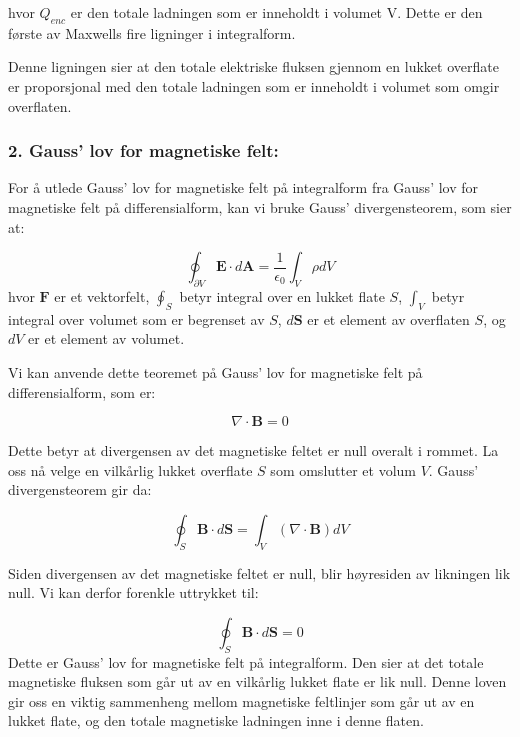 hvor $Q_{enc}$ er den totale ladningen som er inneholdt i volumet V. Dette er den første av Maxwells fire ligninger i integralform.

Denne ligningen sier at den totale elektriske fluksen gjennom en lukket overflate er proporsjonal med den totale ladningen som er inneholdt i volumet som omgir overflaten.


\subsubsection*{2. Gauss' lov for magnetiske felt:}
For å utlede Gauss' lov for magnetiske felt på integralform fra Gauss' lov for magnetiske felt på differensialform, kan vi bruke Gauss' divergensteorem, som sier at:

\begin{equation*}
    \oint_{\partial V} \mathbf{E} \cdot d \mathbf{A}=\frac{1}{\epsilon_{0}} \int_{V} \rho d V 
\end{equation*}
hvor $\mathbf{F}$ er et vektorfelt, $\oint_S$ betyr integral over en lukket flate $S$, $\int_V$ betyr integral over volumet som er begrenset av $S$, $d\mathbf{S}$ er et element av overflaten $S$, og $dV$ er et element av volumet.

Vi kan anvende dette teoremet på Gauss' lov for magnetiske felt på differensialform, som er:

\begin{equation*}
    \nabla \cdot \mathbf{B}=0 
\end{equation*}

Dette betyr at divergensen av det magnetiske feltet er null overalt i rommet. La oss nå velge en vilkårlig lukket overflate $S$ som omslutter et volum $V$. Gauss' divergensteorem gir da:

\begin{equation*}
    \oint_{S} \mathbf{B} \cdot d \mathbf{S}=\int_{V}(\nabla \cdot \mathbf{B}) d V
\end{equation*}

Siden divergensen av det magnetiske feltet er null, blir høyresiden av likningen lik null. Vi kan derfor forenkle uttrykket til:

\begin{equation*}
    \oint_{S} \mathbf{B} \cdot d \mathbf{S}=0 
\end{equation*}
Dette er Gauss' lov for magnetiske felt på integralform. Den sier at det totale magnetiske fluksen som går ut av en vilkårlig lukket flate er lik null. Denne loven gir oss en viktig sammenheng mellom magnetiske feltlinjer som går ut av en lukket flate, og den totale magnetiske ladningen inne i denne flaten.
